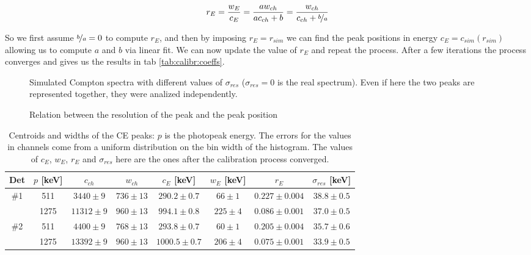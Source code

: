 \documentclass[11pt,a4 paper]{article}
\let\oldfrac\frac
\renewcommand{\frac}[3][d]{\ifthenelse{\equal{#1}{d}}{\oldfrac{#2}{#3}}{\nicefrac{#2}{#3}}}
\begin{document}
\begin{equation*}
  r_E = \frac{w_E}{c_E} = \frac{a w_{ch}}{a c_{ch} + b} = \frac{w_{ch}}{c_{ch} + \frac[f]{b}{a}}
\end{equation*}

So we first assume $\frac[f]{b}{a} = 0$ to compute $r_E$, and then by imposing $r_E = r_{sim}$ we can find the peak positions in energy $c_E = c_{sim}(r_{sim})$ allowing us to compute $a$ and $b$ via linear fit. We can now update the value of $r_E$ and repeat the process. After a few iterations the process converges and gives us the results in tab \ref{tab:calibr:coeffs}.

\begin{figure}
  \centering
  \caption{Simulated Compton spectra with different values of $\sigma_{res}$ ($\sigma_{res} = 0$ is the real spectrum). Even if here the two peaks are represented together, they were analized independently.}
  \label{fig:sim:spectra}
\end{figure}

\begin{figure}[H]
    \centering
    \caption{Relation between the resolution of the peak and the peak position}
    \label{fig:sim}
\end{figure}


\begin{table}[H]
  \centering
  \begin{tabular}{cccccccc}
    \toprule
    Det & $p$ [keV] & $c_{ch}$ & $w_{ch}$ & $c_E$ [keV] & $w_E$ [keV] & $r_E$ & $\sigma_{res}$ [keV]\\
    \midrule
    \#1 & 511 & $3440 \pm 9$ & $736 \pm 13$ & $290.2 \pm 0.7$ & $66 \pm 1$ & $0.227 \pm 0.004$ & $38.8 \pm 0.5$ \\
        & 1275 & $11312 \pm 9$ & $960 \pm 13$ & $994.1 \pm 0.8$ & $225 \pm 4$ & $0.086 \pm 0.001$ & $37.0 \pm 0.5$ \\
    \#2 & 511 & $4400 \pm 9$ & $768 \pm 13$ & $293.8 \pm 0.7$ & $60 \pm 1$ & $0.205 \pm 0.004$ & $35.7 \pm 0.6$ \\
        & 1275 & $13392 \pm 9$ & $960 \pm 13$ & $1000.5 \pm 0.7$ & $206 \pm 4$ & $0.075 \pm 0.001$ & $33.9 \pm 0.5$ \\
    \bottomrule
  \end{tabular}
  \caption{Centroids and widths of the CE peaks: $p$ is the photopeak energy. The errors for the values in channels come from a uniform distribution on the bin width of the histogram. The values of $c_E$, $w_E$, $r_E$ and $\sigma_{res}$ here are the ones after the calibration process converged.}
  \label{tab:calibr:fits}
\end{table}
\end{document}
